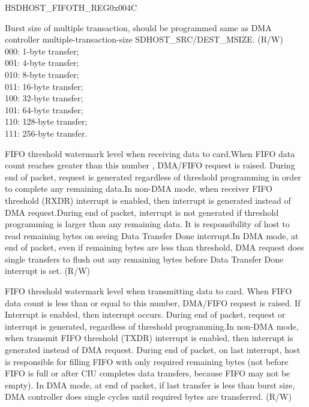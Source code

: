 \begin{register}{H}{SDHOST\_FIFOTH\_REG}{0x{}004C}\label{regdesc:FIFOTHREG}
%
%
%
%
%
%
\regnewline%
\begin{regdesc}\begin{reglist}
\item [SDHOST\_DMA\_MULTIPLE\_TRANSACTION\_SIZE]Burst size of multiple transaction, should be programmed same as DMA controller multiple-transaction-size SDHOST\_SRC/DEST\_MSIZE. (R/W)\\
000: 1-byte transfer; \\
001: 4-byte transfer; \\
010: 8-byte transfer; \\
011: 16-byte transfer; \\
100: 32-byte transfer; \\
101: 64-byte transfer; \\
110: 128-byte transfer; \\
111: 256-byte transfer.
\item [SDHOST\_RX\_WMARK]FIFO threshold watermark level when receiving data to card.When FIFO data count reaches greater than this number , DMA/FIFO request is raised. During end of packet, request is generated regardless of threshold programming in order to complete any remaining data.In non-DMA mode, when receiver FIFO threshold (RXDR) interrupt is enabled, then interrupt is generated instead of DMA request.During end of packet, interrupt is not generated if threshold programming is larger than any remaining data. It is responsibility of host to read remaining bytes on seeing Data Transfer Done interrupt.In DMA mode, at end of packet, even if remaining bytes are less than threshold, DMA request does single transfers to flush out any remaining bytes before Data Transfer Done interrupt is set. (R/W)
\item [SDHOST\_TX\_WMARK]FIFO threshold watermark level when transmitting data to card. When FIFO data count is less than or equal to this number, DMA/FIFO request is raised. If Interrupt is enabled, then interrupt  occurs. During end of packet, request or interrupt is generated, regardless of threshold programming.In non-DMA mode, when transmit FIFO threshold (TXDR) interrupt is enabled, then interrupt is generated instead of DMA request. During end of packet, on last interrupt, host is responsible for filling FIFO with only required remaining bytes (not before FIFO is full or after CIU completes data transfers, because FIFO may not be empty).  In DMA mode, at end of packet, if last transfer is less than burst  size, DMA controller does single cycles until required bytes are  transferred. (R/W)
\end{reglist}\end{regdesc}
\end{register}


